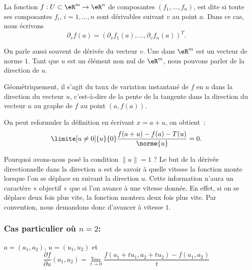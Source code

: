\begin{definition}
  La fonction $f:U\subset\eR^m\to \eR^n$ de composantes $(f_1,\ldots, f_n)$, est dite  si toute ses composantes $f_i$, $i=1,\ldots, n$ sont dérivables suivant $v$ au point $a$. Dans ce cas, nous écrivons
  \begin{equation}
	\partial_v f(a)=\left(\partial_v f_1(a), \ldots, \partial_v f_n(a)\right)^T.
  \end{equation}
\end{definition}
On parle aussi souvent de dérivée  du vecteur $v$. Une  dans $\eR^m$ est un vecteur de norme $1$. Tant que $u$ est un élément non nul de $\eR^m$, nous pouvons parler de la direction de $u$.

Géométriquement, il s'agit du taux de variation instantané de $f$ en $a$ dans la direction du vecteur $u$, c'est-à-dire de la pente de la tangente dans la direction du vecteur $u$ au graphe de $f$ au point $(a, f(a))$.

\begin{remark}
On peut reformuler la définition en écrivant $x = a + u$, on obtient~:
\begin{equation}
    \limite[u\neq 0]{u}{0} \frac{f(a+u)-f(a)-T(u)}{\norme{u}} = 0.
\end{equation}
\end{remark}

\begin{remark}
Pourquoi avons-nous posé la condition $\| u \|=1$ ? Le but de la dérivée directionnelle dans la direction $u$ est de savoir à quelle vitesse la fonction monte lorsque l'on se déplace en suivant la direction $u$. Cette information n'aura un caractère « objectif » que si l'on avance à une vitesse donnée. En effet, si on se déplace deux fois plus vite, la fonction montera deux fois plus vite. Par convention, nous demandons donc d'avancer à vitesse $1$.
\end{remark}

\subsubsection*{Cas particulier où $n=2$:} $a = (a_1, a_2)$, $u =
(u_1,u_2)$ et
$$\frac{\partial f}{\partial u}(a_1, a_2) = \lim_{t\rightarrow
0}\frac{f(a_1+tu_1,a_2+tu_2) - f(a_1, a_2)}{t}$$

